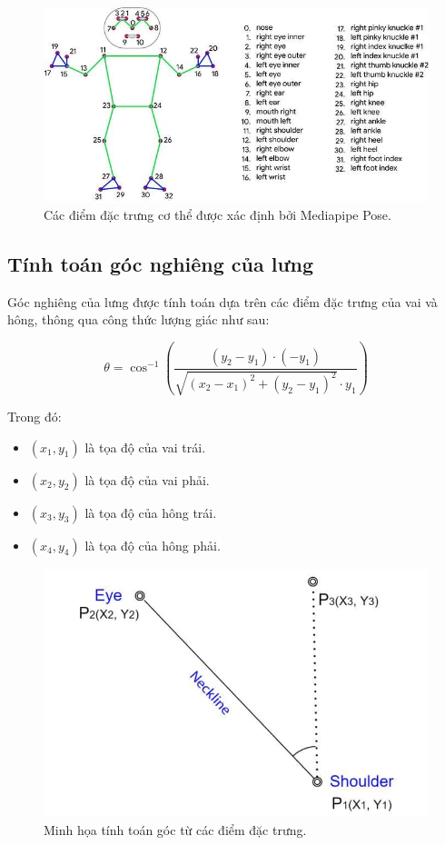\documentclass[journal,onecolumn]{IEEEtran}
\begin{document}
\begin{figure}[H]
    \centering
    \includegraphics[width=0.8\linewidth]{images/body_keypoints.png}
    \caption{Các điểm đặc trưng cơ thể được xác định bởi Mediapipe Pose.}
    \label{fig:body_keypoints}
\end{figure}

\subsection{\textbf{Tính toán góc nghiêng của lưng}}
Góc nghiêng của lưng được tính toán dựa trên các điểm đặc trưng của vai và hông, thông qua công thức lượng giác như sau:

\begin{equation}
\theta = \cos^{-1}\left( \frac{(y_2 - y_1) \cdot (-y_1)}{\sqrt{(x_2 - x_1)^2 + (y_2 - y_1)^2} \cdot y_1} \right)
\end{equation}

Trong đó:
\begin{itemize}
    \item $(x_1, y_1)$ là tọa độ của vai trái.
    \item $(x_2, y_2)$ là tọa độ của vai phải.
    \item $(x_3, y_3)$ là tọa độ của hông trái.
    \item $(x_4, y_4)$ là tọa độ của hông phải.
\end{itemize}

\begin{figure}[H]
    \centering
    \includegraphics[width=0.7\linewidth]{images/angle_calculation.png}
    \caption{Minh họa tính toán góc từ các điểm đặc trưng.}
    \label{fig:angle_calculation}
\end{figure}
\end{document}
